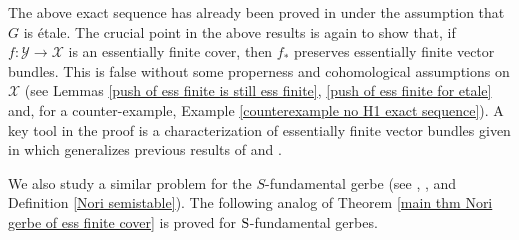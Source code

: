 \documentclass[12pt,reqno]{amsart}
\theoremstyle{plain}
\theoremstyle{definition}
\numberwithin{thm}{section}
\newcounter{x}\setcounter{x}{1}
\theoremstyle{plain}
\begin{document}
The above exact sequence has already been proved in \cite[Thoerem 2.9]{EHS} under the assumption that $G$ is \'etale. 
The crucial point in the above results is again to show that, if $f\colon {\mathcal{Y}}{\longrightarrow} {\mathcal{X}}$ is an essentially finite cover, then $f_*$ preserves essentially finite vector bundles. This is false without some properness and cohomological assumptions on ${\mathcal{X}}$
(see Lemmas \ref{push of ess finite is still ess finite}, \ref{push of ess finite for etale}
and, for a counter-example, Example \ref{counterexample no H1 exact sequence}).
A key tool in the proof is a characterization of essentially finite vector bundles given in \cite{TZ2} which generalizes previous results of \cite{BDS} and \cite{AM}.
  
We also study a similar problem for the $S$-fundamental gerbe (see \cite{BPS}, \cite{L1}, \cite{L2} and Definition \ref{Nori 
semistable}). The following analog of Theorem \ref{main thm Nori gerbe of ess finite 
cover} is proved for ${\textup{S}}$-fundamental gerbes.
\end{document}
